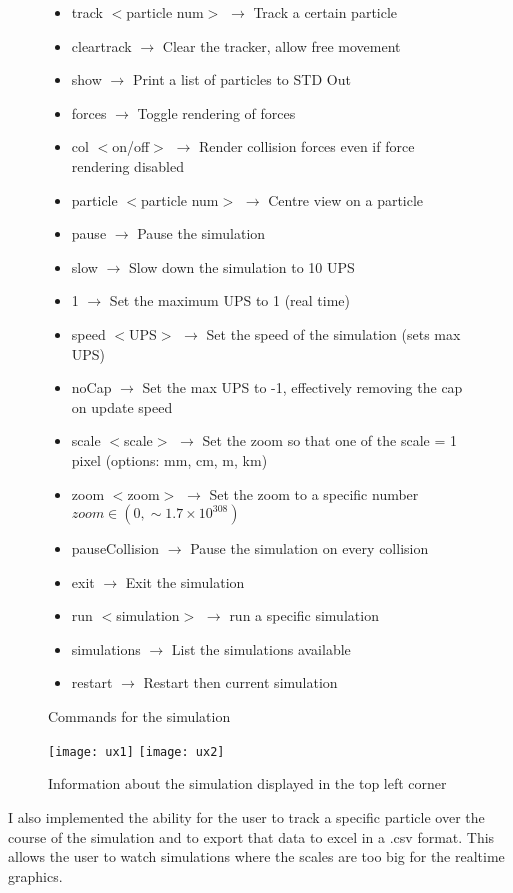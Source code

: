 	\begin{figure}[h]
		\begin{itemize}
			\item track $<$particle num$>$ $\rightarrow$ Track a certain particle
			\item cleartrack $\rightarrow$ Clear the tracker, allow free movement
			\item show $\rightarrow$ Print a list of particles to STD Out
			\item forces $\rightarrow$ Toggle rendering of forces
			\item col $<$on/off$>$ $\rightarrow$ Render collision forces even if force rendering disabled
			\item particle $<$particle num$>$ $\rightarrow$ Centre view on a particle
			\item pause $\rightarrow$ Pause the simulation
			\item slow $\rightarrow$ Slow down the simulation to 10 UPS
			\item 1 $\rightarrow$ Set the maximum UPS to 1 (real time)
			\item speed $<$UPS$>$ $\rightarrow$ Set the speed of the simulation (sets max UPS)
			\item noCap $\rightarrow$ Set the max UPS to -1, effectively removing the cap on update speed
			\item scale $<$scale$>$ $\rightarrow$ Set the zoom so that one of the scale = 1 pixel (options: mm, cm, m, km)			
			\item zoom $<$zoom$>$ $\rightarrow$ Set the zoom to a specific number $zoom \in (0, \sim1.7\times10^{308})$
			\item pauseCollision $\rightarrow$ Pause the simulation on every collision
			\item exit $\rightarrow$ Exit the simulation
			\item run $<$simulation$>$ $\rightarrow$ run a specific simulation
			\item simulations $\rightarrow$ List the simulations available
			\item restart $\rightarrow$ Restart then current simulation
		\end{itemize}
		\caption{Commands for the simulation}
		\label{fig:commands}
	\end{figure}
	
	\begin{figure}
		\centering
		\texttt{[image: ux1]}
		\texttt{[image: ux2]}
		\caption{Information about the simulation displayed in the top left corner}
		\label{fig:uxImg1}
	\end{figure}

	I also implemented the ability for the user to track a specific particle over the course of the simulation and to export that data to excel in a .csv format. This allows the user to watch simulations where the scales are too big for the realtime graphics.
	
	